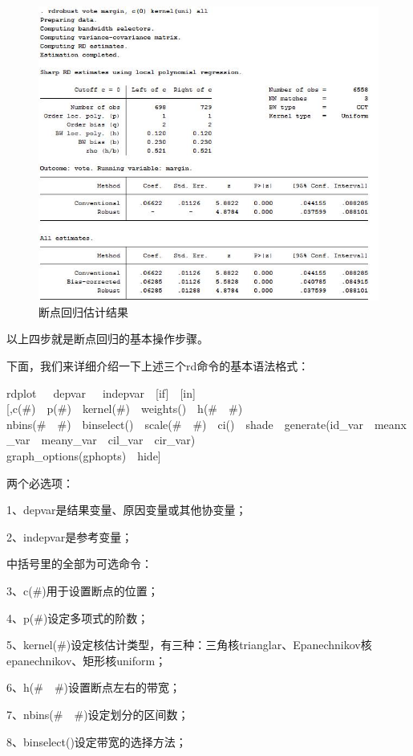 \documentclass[cn,12pt,math=newtx,citestyle=gb7714-2015,bibstyle=gb7714-2015]{elegantbook}
\begin{document}
	\begin{figure}[htbp]
		\centering
		\includegraphics[width=1\textwidth]{rdresults.jpg}
		\caption{断点回归估计结果}\label{fig:digit}
	\end{figure}
	
	以上四步就是断点回归的基本操作步骤。
	
	下面，我们来详细介绍一下上述三个rd命令的基本语法格式：
	
	rdplot~~~depvar~~~indepvar~~[if]~~[in][,c(\#)~~p(\#)~~kernel(\#)~~weights()~~h(\#~~\#)~~\\
	nbins(\#~~\#)~~binselect()~~scale(\#~~\#)~~ci()~~shade~~generate(id\_var~~meanx\_var~~meany\_var~~cil\_var~~cir\_var)~~\\
	graph\_options(gphopts)~~hide]
	
	两个必选项：
	
	1、depvar是结果变量、原因变量或其他协变量；
	
	2、indepvar是参考变量；
	
	中括号里的全部为可选命令：
	
	3、c(\#)用于设置断点的位置；
	
	4、p(\#)设定多项式的阶数；
	
	5、kernel(\#)设定核估计类型，有三种：三角核trianglar、Epanechnikov核epanechnikov、矩形核uniform；
	
	6、h(\#~~\#)设置断点左右的带宽；
	
	7、nbins(\#~~\#)设定划分的区间数；
	
	8、binselect()设定带宽的选择方法；
	
\end{document}
